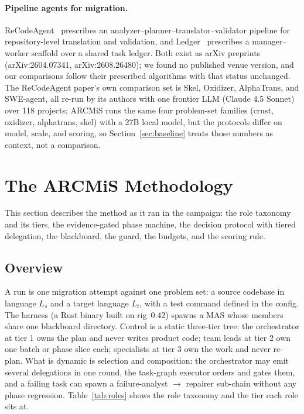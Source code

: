 \documentclass[11pt]{article}
\begin{document}
\paragraph{Pipeline agents for migration.}
ReCodeAgent~\cite{recodeagent2026} prescribes an
analyzer--planner--translator--validator pipeline for repository-level
translation and validation, and Ledger~\cite{ledger2026} prescribes a
manager--worker scaffold over a shared task ledger. Both exist as arXiv
preprints (arXiv:2604.07341, arXiv:2608.26480); we found no published
venue version, and our comparisons follow their prescribed algorithms
with that status unchanged. The ReCodeAgent paper's own comparison
set is Skel, Oxidizer, AlphaTrans, and SWE-agent, all re-run by its
authors with one frontier LLM (Claude 4.5 Sonnet) over 118 projects;
ARCMiS runs the same four problem-set families (crust, oxidizer,
alphatrans, skel) with a 27B local model, but the protocols differ on
model, scale, and scoring, so Section~\ref{sec:baseline} treats those
numbers as context, not a comparison.

\section{The ARCMiS Methodology}
\label{sec:method}

This section describes the method as it ran in the campaign: the role
taxonomy and its tiers, the evidence-gated phase machine, the decision
protocol with tiered delegation, the blackboard, the guard, the budgets,
and the scoring rule.

\subsection{Overview}

A run is one migration attempt against one problem set: a source codebase
in language $L_s$ and a target language $L_t$, with a test command defined
in the config. The harness (a Rust binary built on rig~0.42) spawns a MAS
whose members share one blackboard directory. Control is a static
three-tier tree: the orchestrator at tier 1 owns the plan and never
writes product code; team leads at tier 2 own one batch or phase slice
each; specialists at tier 3 own the work and never re-plan. What is
dynamic is selection and composition: the orchestrator may emit several
delegations in one round, the task-graph executor orders and gates them,
and a failing task can spawn a failure-analyst $\rightarrow$ repairer
sub-chain without any phase regression. Table~\ref{tab:roles} shows the
role taxonomy and the tier each role sits at.
\end{document}
